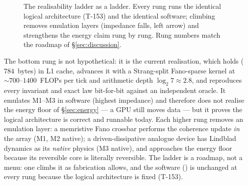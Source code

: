 \begin{figure}[H]
\centering
{}
\caption{The realisability ladder as a ladder. Every rung runs the identical
logical architecture (T-153) and the identical software; climbing removes
emulation layers (impedance falls, left arrow) and strengthens the energy
claim rung by rung. Rung numbers
match the roadmap of \S\ref{sec:discussion}.}
\label{fig:ladderfig}
\end{figure}

The bottom rung is not hypothetical: it is the current \SYNARC{} realisation,
which holds \DM{} ($784$~bytes) in L1 cache, advances it with a
Strang-split Fano-sparse kernel at $\sim\!700$--$1400$~FLOPs per tick and
arithmetic depth $\log_2 7\approx 2.8$, and reproduces every invariant and
exact law bit-for-bit against an independent oracle. It emulates M1--M3 in
software (highest impedance) and therefore does not realise the energy floor
of \S\ref{sec:energy} --- a GPU still moves data --- but it proves the logical
architecture is correct and runnable today. Each higher rung removes an
emulation layer: a memristive Fano crossbar performs the coherence update
\emph{in} the array (M1, M2 native); a driven-dissipative analogue device has
Lindblad dynamics as its \emph{native} physics (M3 native), and approaches
the energy floor because its reversible core is literally reversible. The
ladder is a roadmap, not a menu: one climbs it as fabrication allows, and the
software (\SYNARC{}) is unchanged at every rung because the logical
architecture is fixed (T-153).
